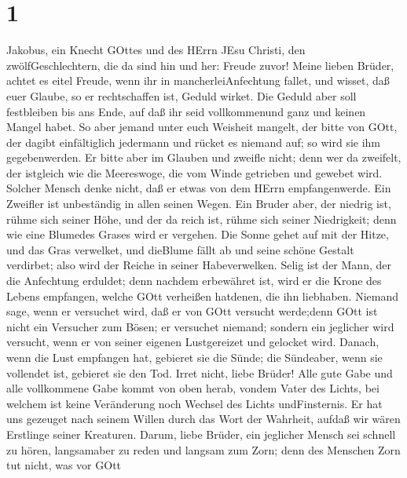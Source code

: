 \hypertarget{section}{%
\section{1}\label{section}}

 Jakobus, ein Knecht GOttes und des HErrn JEsu Christi, den
zwölfGeschlechtern, die da sind hin und her: Freude zuvor! 
Meine lieben Brüder, achtet es eitel Freude, wenn ihr in
mancherleiAnfechtung fallet,  und wisset, daß euer Glaube,
so er rechtschaffen ist, Geduld wirket.  Die Geduld aber
soll festbleiben bis ans Ende, auf daß ihr seid vollkommenund ganz und
keinen Mangel habet.  So aber jemand unter euch Weisheit
mangelt, der bitte von GOtt, der dagibt einfältiglich jedermann und
rücket es niemand auf; so wird sie ihm gegebenwerden.  Er
bitte aber im Glauben und zweifle nicht; denn wer da zweifelt, der
istgleich wie die Meereswoge, die vom Winde getrieben und gewebet wird.
 Solcher Mensch denke nicht, daß er etwas von dem HErrn
empfangenwerde.  Ein Zweifler ist unbeständig in allen
seinen Wegen.  Ein Bruder aber, der niedrig ist, rühme sich
seiner Höhe,  und der da reich ist, rühme sich seiner
Niedrigkeit; denn wie eine Blumedes Grases wird er vergehen.
 Die Sonne gehet auf mit der Hitze, und das Gras verwelket,
und dieBlume fällt ab und seine schöne Gestalt verdirbet; also wird der
Reiche in seiner Habeverwelken.  Selig ist der Mann, der
die Anfechtung erduldet; denn nachdem erbewähret ist, wird er die Krone
des Lebens empfangen, welche GOtt verheißen hatdenen, die ihn liebhaben.
 Niemand sage, wenn er versuchet wird, daß er von GOtt
versucht werde;denn GOtt ist nicht ein Versucher zum Bösen; er versuchet
niemand;  sondern ein jeglicher wird versucht, wenn er von
seiner eigenen Lustgereizet und gelocket wird.  Danach,
wenn die Lust empfangen hat, gebieret sie die Sünde; die Sündeaber, wenn
sie vollendet ist, gebieret sie den Tod.  Irret nicht,
liebe Brüder!  Alle gute Gabe und alle vollkommene Gabe
kommt von oben herab, vondem Vater des Lichts, bei welchem ist keine
Veränderung noch Wechsel des Lichts undFinsternis.  Er hat
uns gezeuget nach seinem Willen durch das Wort der Wahrheit, aufdaß wir
wären Erstlinge seiner Kreaturen.  Darum, liebe Brüder, ein
jeglicher Mensch sei schnell zu hören, langsamaber zu reden und langsam
zum Zorn;  denn des Menschen Zorn tut nicht, was vor GOtt
